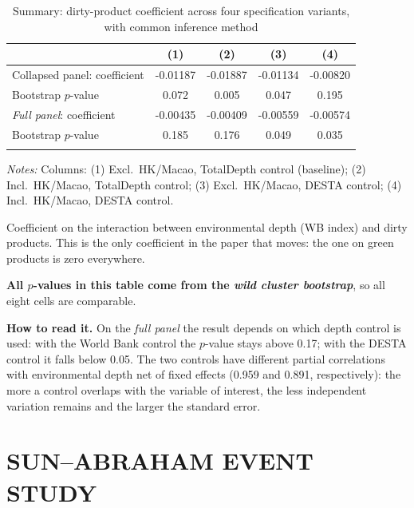 \documentclass{article}
\begin{document}
\begin{table}[htbp]
\centering
\footnotesize
\caption{Summary: dirty-product coefficient across four specification variants, with common inference method}
\label{tab:matrice}
\begin{threeparttable}
\begin{tabular}{lcccc}
\toprule
 & (1) & (2) & (3) & (4) \\
\midrule
Collapsed panel: coefficient & -0.01187 & -0.01887 & -0.01134 & -0.00820 \\
\quad Bootstrap $p$-value & 0.072 & 0.005 & 0.047 & 0.195 \\
\addlinespace
\emph{Full panel}: coefficient & -0.00435 & -0.00409 & -0.00559 & -0.00574 \\
\quad Bootstrap $p$-value & 0.185 & 0.176 & 0.049 & 0.035 \\
\addlinespace
\bottomrule
\end{tabular}
\begin{tablenotes}[flushleft]\footnotesize
\item \emph{Notes:} Columns: (1) Excl.\ HK/Macao, TotalDepth control (baseline); (2) Incl.\ HK/Macao, TotalDepth control; (3) Excl.\ HK/Macao, DESTA control; (4) Incl.\ HK/Macao, DESTA control.
\item Coefficient on the interaction between environmental depth (WB index) and dirty products. This is the only coefficient in the paper that moves: the one on green products is zero everywhere.
\item \textbf{All $p$-values in this table come from the \emph{wild cluster bootstrap}}, so all eight cells are comparable.
\item \textbf{How to read it.} On the \emph{full panel} the result depends on which depth control is used: with the World Bank control the $p$-value stays above 0.17; with the DESTA control it falls below 0.05. The two controls have different partial correlations with environmental depth net of fixed effects (0.959 and 0.891, respectively): the more a control overlaps with the variable of interest, the less independent variation remains and the larger the standard error.
\end{tablenotes}
\end{threeparttable}
\end{table}


\newpage
\section{SUN--ABRAHAM EVENT STUDY}
\end{document}
